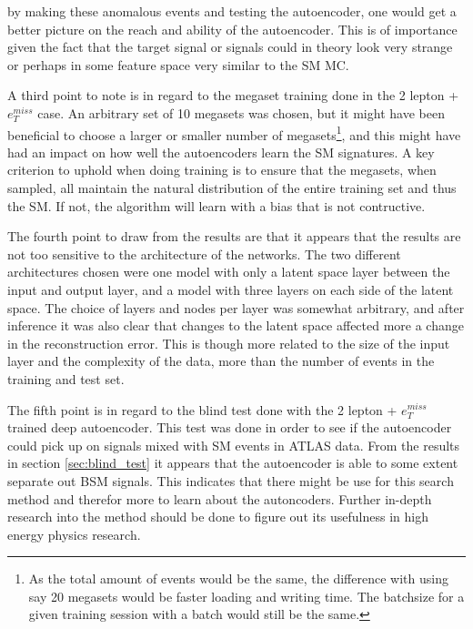 by making these anomalous events and testing the autoencoder, one would get a better 
picture on the reach and ability of the autoencoder. This is of importance given the 
fact that the target signal or signals could in theory look very strange or perhaps 
in some feature space very similar to the SM MC. \par 
A third point to note is in regard to the megaset training done in the 2 lepton + 
$e_T^{miss}$ case. An arbitrary set of 10 megasets was chosen, but it might 
have been beneficial to choose a larger or smaller number of megasets\footnote{As the total 
amount of events would be the same, the difference with using say 20 megasets would 
be faster loading and writing time. The batchsize for a given training session with a batch 
would still be the same. }, and this might have had an impact
on how well the autoencoders learn the SM signatures. A key criterion to uphold when 
doing training is to ensure that the megasets, when sampled, all maintain the natural distribution of 
the entire training set and thus the SM. If not, the algorithm will learn
with a bias that is not contructive. \par 
The fourth point to draw from the results are that it appears that the results are not 
too sensitive to the architecture of the networks. The two different architectures chosen
were one model with only a latent space layer between the input and output layer, and a model
with three layers on each side of the latent space. The choice of layers and nodes per layer 
was somewhat arbitrary, and after inference it was also clear that changes to the latent space 
affected more a change in the reconstruction error. This is though 
more related to the size of the input layer and the complexity of the data, more than 
the number of events in the training and test set. \par 
The fifth point is in regard to the blind test done with the 2 lepton + $e_T^{miss}$ trained 
deep autoencoder. This test was done in order to see if the autoencoder could pick up on
signals mixed with SM events in ATLAS data. 
From the results in section \ref{sec:blind_test} it appears that the autoencoder is able
to some extent separate out BSM signals. This indicates that there might be use for this 
search method and therefor more to learn about the autoncoders. Further in-depth research into 
the method should be done to figure out its usefulness in high energy physics research. 